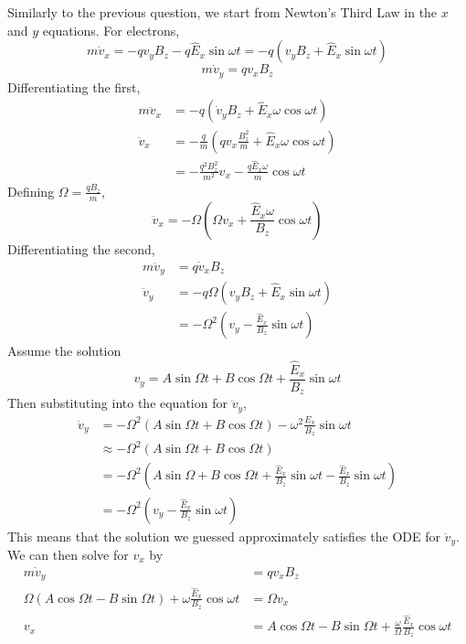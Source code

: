 \documentclass[answers]{exam}
\begin{document}
\begin{questions}
\begin{solution}
    Similarly to the previous question, we start from Newton's Third Law in the $x$ and $y$ equations. For electrons,
    $$m\dot v_x = -q v_y B_z - q\hat E_x\sin\omega t = -q(v_yB_z + \hat E_x\sin\omega t)$$
    $$m\dot v_y = q v_x B_z$$
    Differentiating the first,
    \begin{align*}
        m\ddot v_x &= -q(\dot v_y B_z + \hat E_x\omega\cos\omega t) \\
        \ddot v_x &= -\frac{q}{m}(q v_x \frac{B_z^2}{m} + \hat E_x\omega\cos\omega t) \\
                  &= -\frac{q^2B_z^2}{m^2}v_x - \frac{q\hat E_x\omega}{m}\cos\omega t
    \end{align*}
    Defining $\Omega = \frac{qB_z}{m}$,
    $$\ddot v_x = -\Omega\left(\Omega v_x + \frac{\hat E_x\omega}{B_z} \cos\omega t\right)$$
    Differentiating the second,
    \begin{align*}
        m\ddot v_y &= q\dot v_xB_z \\
        \ddot v_y &= -q\Omega\left(v_yB_z + \hat E_x \sin\omega t\right) \\
                  &= -\Omega^2\left(v_y - \frac{\hat E_x}{B_z}\sin\omega t\right)
    \end{align*}
    Assume the solution
    $$v_y = A\sin\Omega t + B\cos\Omega t + \frac{\hat E_x}{B_z}\sin\omega t$$
    Then substituting into the equation for $\ddot v_y$,
    \begin{align*}
    \ddot v_y &= -\Omega^2(A\sin\Omega t + B\cos\Omega t) - \omega^2\frac{E_x}{B_z}\sin\omega t \\
              &\approx -\Omega^2(A\sin\Omega t + B\cos\Omega t) \\
              &= -\Omega^2\left(A\sin\Omega + B\cos\Omega t + \frac{\hat E_x}{B_z}\sin\omega t - \frac{\hat E_x}{B_z}\sin\omega t\right) \\
              &= -\Omega^2(v_y - \frac{\hat E_x}{B_z}\sin\omega t)
    \end{align*}
    This means that the solution we guessed approximately satisfies the ODE for $\ddot v_y$. We can then solve for $v_x$ by
    \begin{align*}
        m\dot v_y &= qv_xB_z \\
        \Omega(A\cos\Omega t - B\sin\Omega t) + \omega\frac{\hat E_x}{B_z}\cos\omega t &= \Omega v_x \\
        v_x &= A\cos\Omega t - B\sin\Omega t + \frac{\omega}{\Omega}\frac{\hat E_x}{B_z}\cos\omega t
    \end{align*}

\end{solution}
\end{questions}
\end{document}

